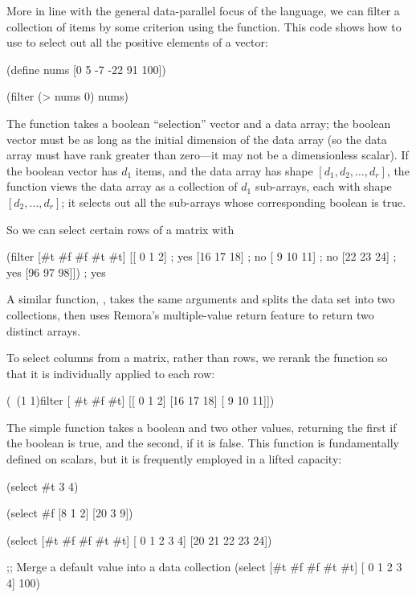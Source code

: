 More in line with the general data-parallel focus of the language,
we can filter a collection of items by some criterion using the
 function.
This code shows how to use 
to select out all the positive elements of a vector:
\begin{code}
    (define nums [0 5 -7 -22 91 100])

    (filter (> nums 0) nums)
\result{[5 91 100]}\end{code}

The  function takes a boolean ``selection'' vector and a data array;
the boolean vector must be as long as the initial dimension of the data array
(so the data array must have rank greater than zero---it
may not be a dimensionless scalar).
If the boolean vector has $d_1$ items,
and the data array has shape $[d_1, d_2,\ldots,d_r]$,
the function views the data array as a collection of $d_1$ sub-arrays,
each with shape $[d_2,\ldots,d_r]$;
it selects out all the sub-arrays whose corresponding boolean is true.

So we can select certain rows of a matrix with
\label{example:matrix-filter}
\begin{code}
    (filter [#t #f #f #t #t]
            [[ 0  1  2]    ; yes
             [16 17 18]    ; no
             [ 9 10 11]    ; no
             [22 23 24]    ; yes
             [96 97 98]])  ; yes
\result{[[ 0  1  2]
 [22 23 24]
 [96 97 98]]}\end{code}
A similar function, ,
takes the same arguments and splits the data set into two collections,
then uses Remora's multiple-value return feature to return two
distinct arrays.

To select columns from a matrix, rather than rows, we rerank the
function so that it is individually applied to each row:
\begin{code}
    (~(1 1)filter [ #t #f #t]
                  [[ 0  1  2]
                   [16 17 18]
                   [ 9 10 11]])
\pagebreak[0]
\result{[[ 0  2]
 [16 18]
 [ 9 11]]}\end{code}

The simple function  takes a boolean and two other values,
returning the first if the boolean is true, and the second, if it is
false.
This function is fundamentally defined on scalars,
but it is frequently employed in a lifted capacity:
\begin{code}
    (select #t 3 4)

    (select #f [8 1 2] [20 3 9])
\result{[20 3 9]}

  (select [#t #f #f #t #t]
          [ 0  1  2  3  4]
          [20 21 22 23 24])
\result{[0 21 22 3 4]}

  ;; Merge a default value into a data collection
  (select [#t #f #f #t #t]
          [ 0  1  2  3  4]
          100)
\result{[0 100 100 3 4]}\end{code}

